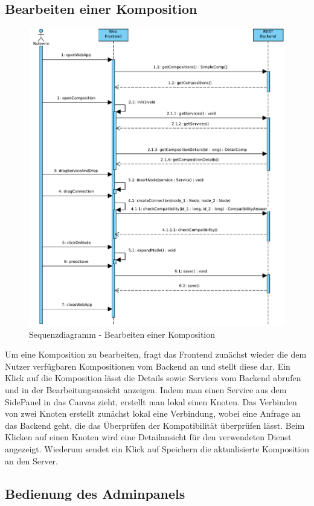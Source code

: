 \subsection*{ Bearbeiten einer Komposition}

\begin{figure}[!h]
	\centering
	\includegraphics[width=.5\textwidth]{img/Diagramme/Sequenz/Frontend_editComp}			
	\caption{Sequenzdiagramm - Bearbeiten einer Komposition}
	\label{fig:sequenz-editComp}
\end{figure}
\noindent
Um eine Komposition zu bearbeiten, fragt das Frontend zunächst wieder die dem Nutzer verfügbaren Kompositionen vom Backend an und stellt diese dar. Ein Klick auf die Komposition lässt die Details sowie Services vom Backend abrufen und in der Bearbeitungsansicht anzeigen. Indem man einen Service aus dem SidePanel in das Canvas zieht, erstellt man lokal einen Knoten. Das Verbinden von zwei Knoten erstellt zunächst lokal eine Verbindung, wobei eine Anfrage an das Backend geht, die das Überprüfen der Kompatibilität überprüfen lässt. Beim Klicken auf einen Knoten wird eine Detailansicht für den verwendeten Dienst angezeigt. Wiederum sendet ein Klick auf Speichern die aktualisierte Komposition an den Server.

\newpage
\subsection*{ Bedienung des Adminpanels}

